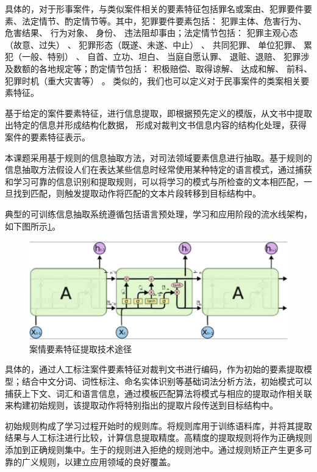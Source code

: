 具体的，对于形事案件，与类似案件相关的要素特征包括罪名或案由、犯罪要件要素、法定情节、酌定情节等。其中，犯罪要件要素包括： 犯罪主体、危害行为、 危害结果、 行为对象、 身份、 违法阻却事由；法定情节包括： 犯罪主观心态（故意、过失） 、 犯罪形态（既遂、未遂、中止） 、 共同犯罪、 单位犯罪、 累犯（一般、特别） 、 自首、立功、坦白、 当庭自愿认罪、 退赃、退赔、 犯罪涉及数额的各地规定等；酌定情节包括： 积极赔偿、取得谅解、 达成和解、 前科、 犯罪时机（重大灾害等） 。 类似的，我们也可以定义对于民事案件的类案相关要素特征。

基于给定的案件要素特征，进行信息提取，即根据预先定义的模版，从文书中提取出特定的信息并形成结构化数据， 形成对裁判文书信息内容的结构化处理，获得案件的要素特征表示。

本课题采用基于规则的信息抽取方法，对司法领域要素信息进行抽取。基于规则的信息抽取方法假设人们在表达某些信息时经常使用某种特定的语言模式，通过捕获和学习可靠的信息识别和提取规则，可以将学习的模式与所检查的文本相匹配，一旦找到匹配，则触发提取动作将匹配的文本片段转移到目标结构中。

典型的可训练信息抽取系统遵循包括语言预处理，学习和应用阶段的流水线架构，如下图所示\ref{fig:sys_element_tech}。

\begin{figure}[htbp]%
    \centering
    \includegraphics[scale=0.30, clip=true]{./sources/lstm.eps}
    \caption{\label{fig:sys_element_tech}案情要素特征提取技术途径}
\end{figure}

具体的，通过人工标注案件要素特征对裁判文书进行编码，作为初始的要素提取模型；结合中文分词、词性标注、命名实体识别等基础词法分析方法，初始模式可以捕获上下文、词汇和语言信息，通过模板匹配算法将模式与相应的提取动作相关联来构建初始规则，该提取动作将特别指出的提取片段传送到目标结构中。

初始规则构成了学习过程开始时的规则库。将规则库用于训练语料库，并将其提取结果与人工标注进行比较，计算信息提取精度。高精度的提取规则将作为正确规则添加到正确规则集中。生于的规则进入拒绝的规则池中。通过规则矫正产生更多可靠的广义规则，以建立应用领域的良好覆盖。

